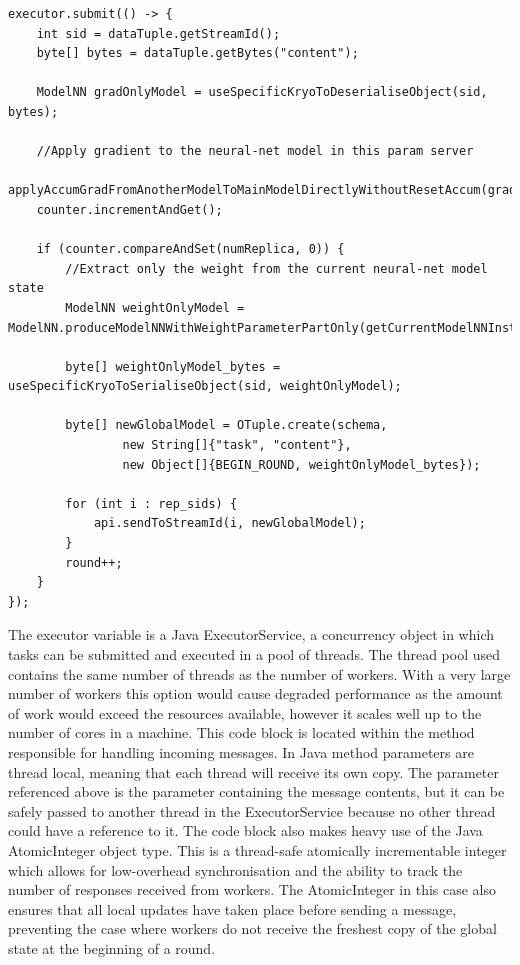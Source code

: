 \documentclass[12pt]{article}
\begin{document}
\begin{lstlisting}[caption={Parameter Server concurrent message handling},label=ParameterServerParallel]
executor.submit(() -> {
	int sid = dataTuple.getStreamId();
	byte[] bytes = dataTuple.getBytes("content");

    ModelNN gradOnlyModel = useSpecificKryoToDeserialiseObject(sid, bytes);

    //Apply gradient to the neural-net model in this param server
    applyAccumGradFromAnotherModelToMainModelDirectlyWithoutResetAccum(gradOnlyModel);
    counter.incrementAndGet();

    if (counter.compareAndSet(numReplica, 0)) {
        //Extract only the weight from the current neural-net model state
        ModelNN weightOnlyModel = ModelNN.produceModelNNWithWeightParameterPartOnly(getCurrentModelNNInstance());

        byte[] weightOnlyModel_bytes = useSpecificKryoToSerialiseObject(sid, weightOnlyModel);

        byte[] newGlobalModel = OTuple.create(schema,
                new String[]{"task", "content"},
                new Object[]{BEGIN_ROUND, weightOnlyModel_bytes});

        for (int i : rep_sids) {
            api.sendToStreamId(i, newGlobalModel);
        }
        round++;
    }
});
\end{lstlisting}

The executor variable is a Java ExecutorService, a concurrency object in which tasks can be submitted and executed in a pool of threads. The thread pool used contains the same number of threads as the number of workers. With a very large number of workers this option would cause degraded performance as the amount of work would exceed the resources available, however it scales well up to the number of cores in a machine.
\newline
\newline
This code block is located within the method responsible for handling incoming messages. In Java method parameters are thread local, meaning that each thread will receive its own copy. The  parameter referenced above is the parameter containing the message contents, but it can be safely passed to another thread in the ExecutorService because no other thread could have a reference to it. The code block also makes heavy use of the Java AtomicInteger object type. This is a thread-safe atomically incrementable integer which allows for low-overhead synchronisation and the ability to track the number of responses received from workers. The AtomicInteger in this case also ensures that all local updates have taken place before sending a  message, preventing the case where workers do not receive the freshest copy of the global state at the beginning of a round.
\end{document}
